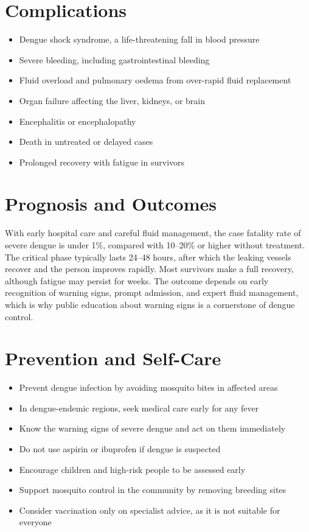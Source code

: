 \section*{Complications}
\begin{itemize}
    \item Dengue shock syndrome, a life-threatening fall in blood pressure
    \item Severe bleeding, including gastrointestinal bleeding
    \item Fluid overload and pulmonary oedema from over-rapid fluid replacement
    \item Organ failure affecting the liver, kidneys, or brain
    \item Encephalitis or encephalopathy
    \item Death in untreated or delayed cases
    \item Prolonged recovery with fatigue in survivors
\end{itemize}

\section*{Prognosis and Outcomes}
With early hospital care and careful fluid management, the case fatality rate of severe dengue is under 1\%, compared with 10--20\% or higher without treatment. The critical phase typically lasts 24--48 hours, after which the leaking vessels recover and the person improves rapidly. Most survivors make a full recovery, although fatigue may persist for weeks. The outcome depends on early recognition of warning signs, prompt admission, and expert fluid management, which is why public education about warning signs is a cornerstone of dengue control.

\section*{Prevention and Self-Care}
\begin{itemize}
    \item Prevent dengue infection by avoiding mosquito bites in affected areas
    \item In dengue-endemic regions, seek medical care early for any fever
    \item Know the warning signs of severe dengue and act on them immediately
    \item Do not use aspirin or ibuprofen if dengue is suspected
    \item Encourage children and high-risk people to be assessed early
    \item Support mosquito control in the community by removing breeding sites
    \item Consider vaccination only on specialist advice, as it is not suitable for everyone
\end{itemize}

